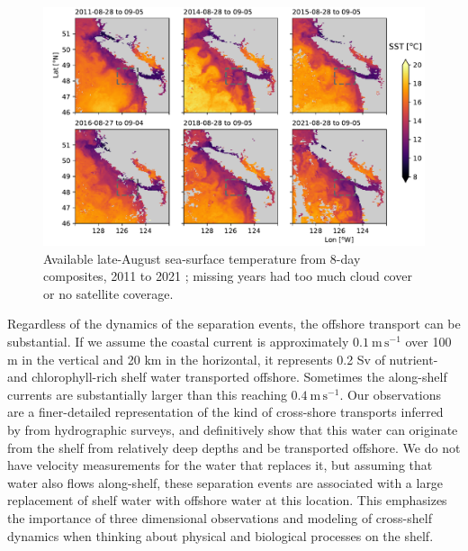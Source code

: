 \documentclass[draft]{agujournal2019}
\begin{document}
\begin{figure}[htbp]
  \begin{center}
    \includegraphics[width=6in]{SSTLateAug}
    \caption{
      Available late-August sea-surface temperature from 8-day composites, 2011 to 2021 \cite{MODISSST8d}; missing years had too much cloud cover or no satellite coverage.  \label{fig:SSTLateAug} }
  \end{center}
\end{figure}

Regardless of the dynamics of the separation events, the offshore transport can be substantial.  If we assume the coastal current is approximately $0.1\ \mathrm{m\,s^{-1}}$ over 100 m in the vertical and 20 km in the horizontal, it represents 0.2 Sv of nutrient- and chlorophyll-rich shelf water transported offshore.  Sometimes the along-shelf currents are substantially larger than this \cite{thomsonkrassovski15} reaching $0.4\ \mathrm{m\,s^{-1}}$.   Our observations are a finer-detailed representation of the kind of cross-shore transports inferred by  from hydrographic surveys, and definitively show that this water can originate from the shelf from relatively deep depths and be transported offshore.  We do not have velocity measurements for the water that replaces it, but assuming that water also flows along-shelf, these separation events are associated with a large replacement of shelf water with offshore water at this location.  This emphasizes the importance of three dimensional observations and modeling of cross-shelf dynamics when thinking about physical and biological processes on the shelf.

\clearpage
%
\end{document}

